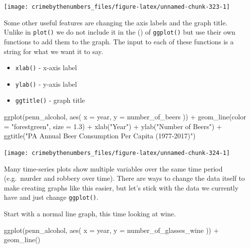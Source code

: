 \documentclass[
  a4paper,
]{krantz}
\makeatletter
\newenvironment{Shaded}{\begin{snugshade}}{\end{snugshade}}
\newcommand{\AttributeTok}[1]{\textcolor[rgb]{0.77,0.63,0.00}{#1}}
\newcommand{\FloatTok}[1]{\textcolor[rgb]{0.00,0.00,0.81}{#1}}
\newcommand{\FunctionTok}[1]{\textcolor[rgb]{0.00,0.00,0.00}{#1}}
\newcommand{\NormalTok}[1]{#1}
\newcommand{\SpecialCharTok}[1]{\textcolor[rgb]{0.00,0.00,0.00}{#1}}
\newcommand{\StringTok}[1]{\textcolor[rgb]{0.31,0.60,0.02}{#1}}
\providecommand{\tightlist}{%
  \setlength{\itemsep}{0pt}\setlength{\parskip}{0pt}}
\newenvironment{kframe}{%
\medskip{}
\setlength{\fboxsep}{.8em}
 \def\at@end@of@kframe{}%
 \ifinner\ifhmode%
  \def\at@end@of@kframe{\end{minipage}}%
  \begin{minipage}{\columnwidth}%
 \fi\fi%
 \def\FrameCommand##1{\hskip\@totalleftmargin \hskip-\fboxsep
 \colorbox{shadecolor}{##1}\hskip-\fboxsep
     \hskip-\linewidth \hskip-\@totalleftmargin \hskip\columnwidth}%
 \MakeFramed {\advance\hsize-\width
   \@totalleftmargin\z@ \linewidth\hsize
   \@setminipage}}%
 {\par\unskip\endMakeFramed%
 \at@end@of@kframe}
\renewenvironment{Shaded}{\begin{kframe}}{\end{kframe}}
\makeatother
\begin{document}
\begin{center}\texttt{[image: crimebythenumbers\_files/figure-latex/unnamed-chunk-323-1]} \end{center}

Some other useful features are changing the axis labels and
the graph title. Unlike in \texttt{plot()} we do not include
it in the () of \texttt{ggplot()} but use their own
functions to add them to the graph. The input to each of
these functions is a string for what we want it to say.

\begin{itemize}
\tightlist
\item
  \texttt{xlab()} - x-axis label
\item
  \texttt{ylab()} - y-axis label
\item
  \texttt{ggtitle()} - graph title
\end{itemize}

\begin{Shaded}
\begin{Highlighting}[]
\FunctionTok{ggplot}\NormalTok{(penn\_alcohol, }\FunctionTok{aes}\NormalTok{(}
  \AttributeTok{x =}\NormalTok{ year,}
  \AttributeTok{y =}\NormalTok{ number\_of\_beers}
\NormalTok{)) }\SpecialCharTok{+}
  \FunctionTok{geom\_line}\NormalTok{(}\AttributeTok{color =} \StringTok{"forestgreen"}\NormalTok{, }\AttributeTok{size =} \FloatTok{1.3}\NormalTok{) }\SpecialCharTok{+}
  \FunctionTok{xlab}\NormalTok{(}\StringTok{"Year"}\NormalTok{) }\SpecialCharTok{+}
  \FunctionTok{ylab}\NormalTok{(}\StringTok{"Number of Beers"}\NormalTok{) }\SpecialCharTok{+}
  \FunctionTok{ggtitle}\NormalTok{(}\StringTok{"PA Annual Beer Consumption Per Capita (1977{-}2017)"}\NormalTok{)}
\end{Highlighting}
\end{Shaded}

\begin{center}\texttt{[image: crimebythenumbers\_files/figure-latex/unnamed-chunk-324-1]} \end{center}

Many time-series plots show multiple variables over the same
time period (e.g.~murder and robbery over time). There are
ways to change the data itself to make creating graphs like
this easier, but let's stick with the data we currently have
and just change \texttt{ggplot()}.

Start with a normal line graph, this time looking at wine.

\begin{Shaded}
\begin{Highlighting}[]
\FunctionTok{ggplot}\NormalTok{(penn\_alcohol, }\FunctionTok{aes}\NormalTok{(}
  \AttributeTok{x =}\NormalTok{ year,}
  \AttributeTok{y =}\NormalTok{ number\_of\_glasses\_wine}
\NormalTok{)) }\SpecialCharTok{+}
  \FunctionTok{geom\_line}\NormalTok{()}
\end{Highlighting}
\end{Shaded}
\end{document}
